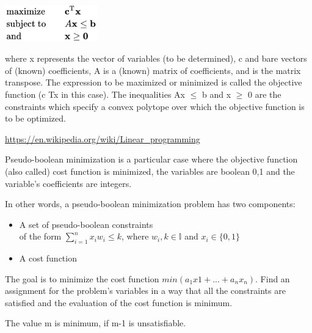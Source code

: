 \begin{center}
	\includegraphics[width=0.3\textwidth]{Figures/linearProgramming.png}
\end{center}

where x represents the vector of variables (to be determined), c and bare vectors of (known)
coefficients, A is a (known) matrix of coefficients, and is the matrix transpose. The expression to be maximized or minimized is called the objective function (c Tx in this case). The inequalities Ax $\leq$ b and x $\geq$ 0 are the constraints which specify a convex polytope over which the
objective function is to be optimized.
\begin{center}
	\href{https://en.wikipedia.org/wiki/Linear\_programming}{https://en.wikipedia.org/wiki/Linear\_programming}
\end{center}
\noindent\makebox[\linewidth]{\rule{\linewidth}{0.4pt}}


Pseudo-boolean minimization is a particular case where the objective function (also called) cost function is minimized, the variables are boolean {0,1} and the variable’s coefficients are integers.  

In other words, a pseudo-boolean minimization problem has two components: 
\begin{itemize}
	\item A set of pseudo-boolean constraints \\
	of the form $\sum_{i=1}^{n} x_{i}w_{i} \leq k$, where $w_{i},k \in \mathbb{I}$ and $x_{i} \in \{0,1\}$
	\item A cost function
\end{itemize}





The goal is to minimize the cost function $min(a_{1}x{1} + ... + a_{n}x_{n})$. Find an assignment for the problem’s variables in a way that all the constraints are satisfied and the evaluation of the cost function is minimum.  

The value m is minimum, if m-1 is unsatisfiable.  






